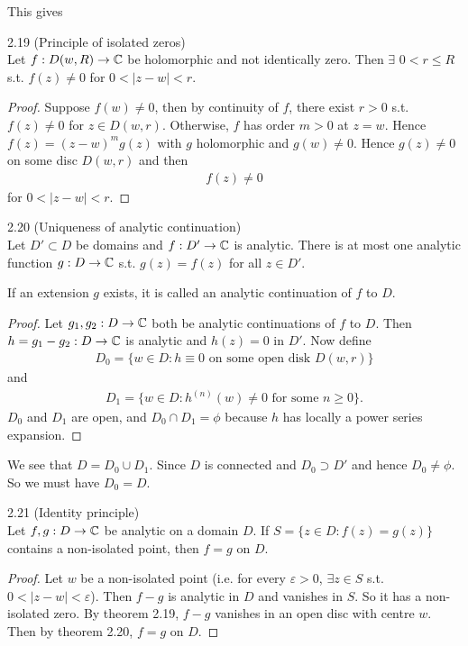 \documentclass[a4paper]{article}
\begin{document}
This gives
\begin{thm} 2.19 (Principle of isolated zeros)\\
Let $f:D(w,R) \to \mathbb{C}$ be holomorphic and not identically zero. Then $\exists$ $0<r \leq R$ s.t. $f(z) \neq 0$ for $0<|z-w|<r$.
\begin{proof}
Suppose $f(w)\neq 0$, then by continuity of $f$, there exist $r>0$ s.t. $f(z) \neq 0$ for $z \in D(w,r)$. Otherwise, $f$ has order $m>0$ at $z=w$. Hence $f(z) = (z-w)^m g(z)$ with $g$ holomorphic and $g(w) \neq 0$. Hence $g(z) \neq 0$ on some disc $D(w,r)$ and then
\begin{equation*}
\begin{aligned}
f(z) \neq 0
\end{aligned}
\end{equation*}
for $0<|z-w|<r$.
\end{proof}
\end{thm}

\begin{thm} 2.20 (Uniqueness of analytic continuation)\\
Let $D' \subset D$ be domains and $f:D' \to \mathbb{C}$ is analytic. There is at most one analytic function $g:D \to \mathbb{C}$ s.t. $g(z) = f(z)$ for all $z \in D'$.

If an extension $g$ exists, it is called an analytic continuation of $f$ to $D$.
\begin{proof}
Let $g_1,g_2: D \to \mathbb{C}$ both be analytic continuations of $f$ to $D$. Then $h = g_1-g_2: D \to \mathbb{C}$ is analytic and $h(z)=0$ in $D'$. Now define
\begin{equation*}
\begin{aligned}
D_0 = \{w \in D: h \equiv 0 \text{ on some open disk } D(w,r)\}
\end{aligned}
\end{equation*}
and
\begin{equation*}
\begin{aligned}
D_1 = \{w \in D: h^{(n)} (w) \neq 0 \text{ for some } n \geq 0\}.
\end{aligned}
\end{equation*}
$D_0$ and $D_1$ are open, and $D_0 \cap D_1 = \phi$ because $h$ has locally a power series expansion.
\end{proof}
We see that $D = D_0 \cup D_1$. Since $D$ is connected and $D_0 \supset D'$ and hence $D_0 \neq \phi$. So we must have $D_0 = D$.
\end{thm}

\begin{coro} 2.21 (Identity principle)\\
Let $f,g:D \to \mathbb{C}$ be analytic on a domain $D$. If $S=\{z \in D:f(z) = g(z)\}$ contains a non-isolated point, then $f=g$ on $D$.
\begin{proof}
Let $w$ be a non-isolated point (i.e. for every $\varepsilon>0$, $\exists z \in S$ s.t. $0<|z-w| < \varepsilon$). Then $f-g$ is analytic in $D$ and vanishes in $S$. So it has a non-isolated zero. By theorem 2.19, $f-g$ vanishes in an open disc with centre $w$. Then by theorem 2.20, $f=g$ on $D$.
\end{proof}
\end{coro}
\end{document}

